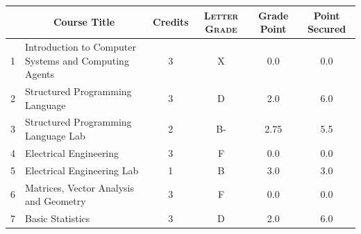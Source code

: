 \documentclass[11pt]{article}
\newcommand*{\numtwo}[1]{\pgfmathprintnumber[
                    fixed, precision=2, fixed zerofill=true]{#1}}
\begin{document}
                \begin{center}
                    \renewcommand{\arraystretch}{1.08}
                    
                \begin{tabular}{|c|l|c|>{\scshape}c|c|c|}
                \hline  \rule[-1ex]{0pt}{3.5ex} {\centering{\bf Course Code}} &  \multicolumn{1}{c|}{\textbf{Course Title}}  & {\bf Credits} & {\bf Letter Grade} & {\bf Grade Point} & {\bf Point Secured}  \\ 
                \hline   1 &  Introduction to Computer Systems and Computing Agents		 & 3 & X & 0.0 & 0.0 \\ %
                \hline   2 &  Structured Programming Language		 & 3 & D & 2.0 & 6.0 \\ %
                \hline   3 &  Structured Programming Language Lab		 & 2 & B- & 2.75 & 5.5 \\ %
                \hline   4 &  Electrical Engineering		 & 3 & F & 0.0 & 0.0 \\ %
                \hline   5 &  Electrical Engineering Lab		 & 1 & B & 3.0 & 3.0 \\ %
                \hline   6 &  Matrices, Vector Analysis and Geometry		 & 3 & F & 0.0 & 0.0 \\ %
                \hline   7 &  Basic Statistics		 & 3 & D & 2.0 & 6.0 \\ %

\hline                %
                \end{tabular}
                \end{center}
                \renewcommand{\arraystretch}{1.03}
\end{document}
